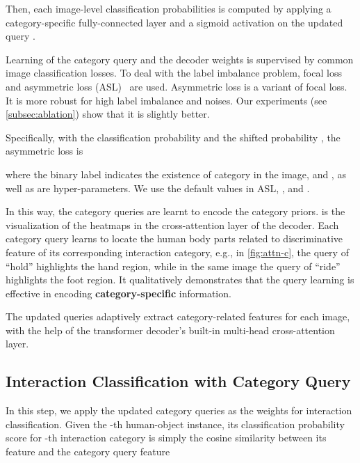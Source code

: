 \documentclass[10pt,twocolumn,letterpaper]{article}
\begin{document}
Then, each image-level classification probabilities  is computed by applying a category-specific fully-connected layer and a sigmoid activation on the updated query .



Learning of the category query  and the decoder weights is supervised by common image classification losses. To deal with the label imbalance problem, focal loss~\cite{lin2017focal} and asymmetric loss (ASL)~\cite{ridnik2021asymmetric} are used. Asymmetric loss is a variant of focal loss. It is more robust for high label imbalance and noises. Our experiments (see \cref{subsec:ablation}) show that it is slightly better.

Specifically, with the classification probability  and the shifted probability , the asymmetric loss is

where the binary label  indicates the existence of category  in the image, and ,  as well as  are hyper-parameters. We use the default values in ASL\cite{ridnik2021asymmetric}, ,  and . 

In this way, the category queries are learnt to encode the category priors.  is the visualization of the heatmaps in the cross-attention layer of the decoder. Each category query learns to locate the human body parts related to discriminative feature of its corresponding interaction category, e.g., in \cref{fig:attn-c}, the query of ``hold'' highlights the hand region, while in the same image the query of ``ride'' highlights the foot region. It qualitatively demonstrates that the query learning is effective in encoding \textbf{category-specific} information.

The updated queries adaptively extract category-related features for each image, with the help of the transformer decoder's built-in multi-head cross-attention layer.

\subsection{Interaction Classification with Category Query}
\label{sec:interaction_classification_with_category_query}

In this step, we apply the updated category queries  as the weights for interaction classification. Given the -th human-object instance, its classification probability score for -th interaction category is simply the cosine similarity between its feature  and the category query feature 
\end{document}
